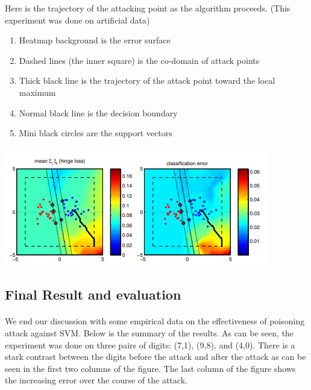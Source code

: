 \documentclass[twoside]{article}
\begin{document}
Here is the trajectory of the attacking point as the algorithm proceeds. (This experiment was done on artificial data) 
\begin{enumerate}
  \item Heatmap background is the error surface
  \item Dashed lines (the inner square) is the co-domain of attack points
  \item Thick black line is the trajectory of the attack point toward the local maximum
  \item Normal black line is the decision boundary
  \item Mini black circles are the support vectors
\end{enumerate}
\paragraph{}
\includegraphics[scale=1]{poisontrajectory.PNG}\\

\subsection{Final Result and evaluation}
\paragraph{}
We end our discussion with some empirical data on the effectiveness of poisoning attack against SVM. Below is the summary of the results. As can be seen, the experiment was done on three pairs of digits: (7,1), (9,8), and (4,0). There is a stark contrast between the digits before the attack and after the attack as can be seen in the first two columns of the figure. The last column of the figure shows the increasing error over the course of the attack. 
\end{document}

